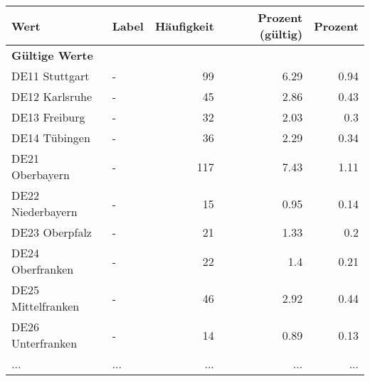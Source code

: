      \begin{longtable}{Xlrrr}
     \toprule
     \textbf{Wert} & \textbf{Label} & \textbf{Häufigkeit} & \textbf{Prozent (gültig)} & \textbf{Prozent} \\
     \endhead
     \midrule
     \multicolumn{5}{l}{\textbf{Gültige Werte}}\\
        \multicolumn{1}{X}{DE11 Stuttgart} & - & \num{99} & \num[round-mode=places,round-precision=2]{6.29} & \num[round-mode=places,round-precision=2]{0.94} \\
        \multicolumn{1}{X}{DE12 Karlsruhe} & - & \num{45} & \num[round-mode=places,round-precision=2]{2.86} & \num[round-mode=places,round-precision=2]{0.43} \\
        \multicolumn{1}{X}{DE13 Freiburg} & - & \num{32} & \num[round-mode=places,round-precision=2]{2.03} & \num[round-mode=places,round-precision=2]{0.3} \\
        \multicolumn{1}{X}{DE14 Tübingen} & - & \num{36} & \num[round-mode=places,round-precision=2]{2.29} & \num[round-mode=places,round-precision=2]{0.34} \\
        \multicolumn{1}{X}{DE21 Oberbayern} & - & \num{117} & \num[round-mode=places,round-precision=2]{7.43} & \num[round-mode=places,round-precision=2]{1.11} \\
        \multicolumn{1}{X}{DE22 Niederbayern} & - & \num{15} & \num[round-mode=places,round-precision=2]{0.95} & \num[round-mode=places,round-precision=2]{0.14} \\
        \multicolumn{1}{X}{DE23 Oberpfalz} & - & \num{21} & \num[round-mode=places,round-precision=2]{1.33} & \num[round-mode=places,round-precision=2]{0.2} \\
        \multicolumn{1}{X}{DE24 Oberfranken} & - & \num{22} & \num[round-mode=places,round-precision=2]{1.4} & \num[round-mode=places,round-precision=2]{0.21} \\
        \multicolumn{1}{X}{DE25 Mittelfranken} & - & \num{46} & \num[round-mode=places,round-precision=2]{2.92} & \num[round-mode=places,round-precision=2]{0.44} \\
        \multicolumn{1}{X}{DE26 Unterfranken} & - & \num{14} & \num[round-mode=places,round-precision=2]{0.89} & \num[round-mode=places,round-precision=2]{0.13} \\
       ... & ... & ... & ... & ... \\

\end{longtable}
